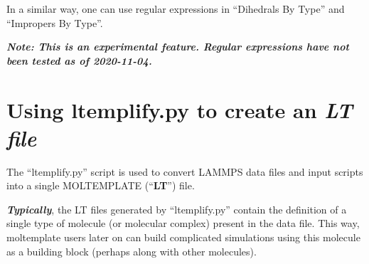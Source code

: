 \documentclass[11pt]{article}
\begin{document}
In a similar way, one can use regular expressions in
``Dihedrals By Type'' and ``Impropers By Type''.

\textbf{\textit{Note: This is an experimental feature.  Regular expressions have not been tested as of 2020-11-04.}}









\section{Using ltemplify.py to create an \textit{LT file}}
\label{sec:ltemplify}

The ``ltemplify.py'' script is used to convert LAMMPS data files and
input scripts into a single MOLTEMPLATE (``\textbf{LT}'') file.

\textbf{\textit{Typically}}, the LT files generated
by ``ltemplify.py'' contain the definition of a single type of molecule
(or molecular complex) present in the data file.
This way, moltemplate users later on can build complicated simulations using
this molecule as a building block (perhaps along with other molecules).
\end{document}
